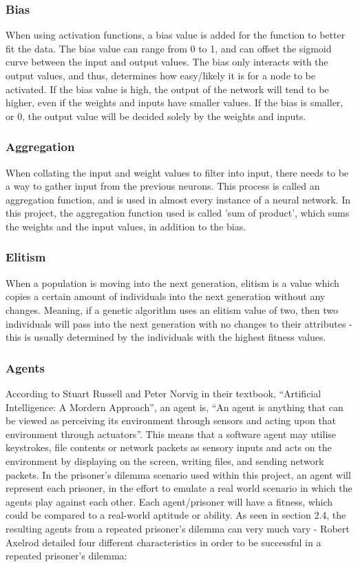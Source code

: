 \documentclass[12pt,a4paper]{article}
\begin{document}
\subsubsection{Bias}
When using activation functions, a bias value is added for the function to better fit the data. The bias value can range from 0 to 1, and can offset the sigmoid curve between the input and output values. The bias only interacts with the output values, and thus, determines how easy/likely it is for a node to be activated. If the bias value is high, the output of the network will tend to be higher, even if the weights and inputs have smaller values. If the bias is smaller, or 0, the output value will be decided solely by the weights and inputs.

\subsubsection{Aggregation}
When collating the input and weight values to filter into input, there needs to be a way to gather input from the previous neurons. This process is called an aggregation function, and is used in almost every instance of a neural network. In this project, the aggregation function used is called 'sum of product', which sums the weights and the input values, in addition to the bias.

\subsubsection{Elitism}
When a population is moving into the next generation, elitism is a value which copies a certain amount of individuals into the next generation without any changes. Meaning, if a genetic algorithm uses an elitism value of two, then two individuals will pass into the next generation with no changes to their attributes - this is usually determined by the individuals with the highest fitness values.

\subsubsection{Agents}
According to Stuart Russell and Peter Norvig in their textbook, “Artificial Intelligence: A Mordern Approach”\cite{38}, an agent is, “An agent is anything that can be viewed as perceiving its environment through sensors and acting upon that environment through actuators”\cite[p.~34]{38}. This means that a software agent may utilise keystrokes, file contents or network packets as sensory inputs and acts on the environment by displaying on the screen, writing files, and sending network packets. In the prisoner's dilemma scenario used within this project, an agent will represent each prisoner, in the effort to emulate a real world scenario in which the agents play against each other. Each agent/prisoner will have a fitness, which could be compared to a real-world aptitude or ability. As seen in section 2.4, the resulting agents from a repeated prisoner's dilemma can very much vary - Robert Axelrod detailed four different characteristics\cite{3} in order to be successful in a repeated prisoner's dilemma:
\end{document}
